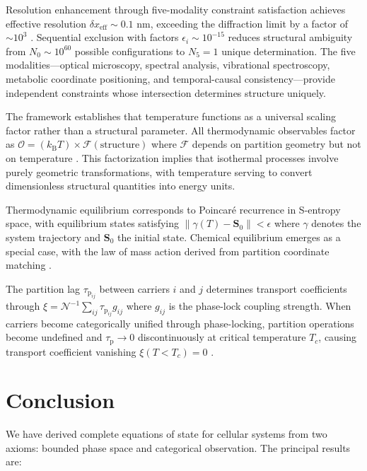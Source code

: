 \documentclass[12pt,a4paper]{article}
\theoremstyle{plain}
\theoremstyle{definition}
\theoremstyle{remark}
\newcommand{\kB}{k_{\mathrm{B}}}
\newcommand{\Scoord}{\mathbf{S}}
\newcommand{\taulag}{\tau_{\mathrm{p}}}
\begin{document}
Resolution enhancement through five-modality constraint satisfaction achieves effective resolution $\delta x_{\text{eff}} \sim 0.1$ nm, exceeding the diffraction limit by a factor of $\sim 10^3$ \citep{abbe1873beitrage}. Sequential exclusion with factors $\epsilon_i \sim 10^{-15}$ reduces structural ambiguity from $N_0 \sim 10^{60}$ possible configurations to $N_5 = 1$ unique determination. The five modalities—optical microscopy, spectral analysis, vibrational spectroscopy, metabolic coordinate positioning, and temporal-causal consistency—provide independent constraints whose intersection determines structure uniquely.

The framework establishes that temperature functions as a universal scaling factor rather than a structural parameter. All thermodynamic observables factor as $\mathcal{O} = (\kB T) \times \mathcal{F}(\text{structure})$ where $\mathcal{F}$ depends on partition geometry but not on temperature \citep{callen1985thermodynamics}. This factorization implies that isothermal processes involve purely geometric transformations, with temperature serving to convert dimensionless structural quantities into energy units.

Thermodynamic equilibrium corresponds to Poincaré recurrence in S-entropy space, with equilibrium states satisfying $\|\gamma(T) - \Scoord_0\| < \epsilon$ where $\gamma$ denotes the system trajectory and $\Scoord_0$ the initial state. Chemical equilibrium emerges as a special case, with the law of mass action derived from partition coordinate matching \citep{haldane1930enzymes}.

The partition lag $\taulag_{ij}$ between carriers $i$ and $j$ determines transport coefficients through $\xi = \mathcal{N}^{-1} \sum_{ij} \taulag_{ij} g_{ij}$ where $g_{ij}$ is the phase-lock coupling strength. When carriers become categorically unified through phase-locking, partition operations become undefined and $\taulag \to 0$ discontinuously at critical temperature $T_c$, causing transport coefficient vanishing $\xi(T < T_c) = 0$ \citep{bardeen1957theory,landau1941theory}.

\section{Conclusion}
\label{sec:conclusion}

We have derived complete equations of state for cellular systems from two axioms: bounded phase space and categorical observation. The principal results are:
\end{document}
